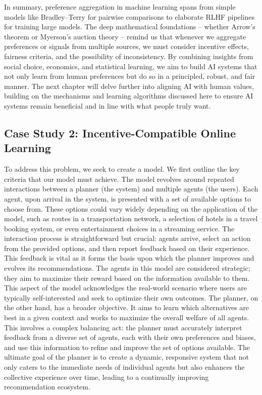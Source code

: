 \documentclass[
  letterpaper,
  numbers=noenddot,
  DIV=11]{scrreprt}
\theoremstyle{plain}
\theoremstyle{definition}
\theoremstyle{remark}
\begin{document}
In summary, preference aggregation in machine learning spans from simple
models like Bradley--Terry for pairwise comparisons to elaborate RLHF
pipelines for training large models. The deep mathematical foundations
-- whether Arrow's theorem or Myerson's auction theory -- remind us that
whenever we aggregate preferences or signals from multiple sources, we
must consider incentive effects, fairness criteria, and the possibility
of inconsistency. By combining insights from social choice, economics,
and statistical learning, we aim to build AI systems that not only learn
from human preferences but do so in a principled, robust, and fair
manner. The next chapter will delve further into aligning AI with human
values, building on the mechanisms and learning algorithms discussed
here to ensure AI systems remain beneficial and in line with what people
truly want.

\subsection{Case Study 2: Incentive-Compatible Online
Learning}\label{case-study-2-incentive-compatible-online-learning}

To address this problem, we seek to create a model. We first outline the
key criteria that our model must achieve. The model revolves around
repeated interactions between a planner (the system) and multiple agents
(the users). Each agent, upon arrival in the system, is presented with a
set of available options to choose from. These options could vary widely
depending on the application of the model, such as routes in a
transportation network, a selection of hotels in a travel booking
system, or even entertainment choices in a streaming service. The
interaction process is straightforward but crucial: agents arrive,
select an action from the provided options, and then report feedback
based on their experience. This feedback is vital as it forms the basis
upon which the planner improves and evolves its recommendations. The
agents in this model are considered strategic; they aim to maximize
their reward based on the information available to them. This aspect of
the model acknowledges the real-world scenario where users are typically
self-interested and seek to optimize their own outcomes. The planner, on
the other hand, has a broader objective. It aims to learn which
alternatives are best in a given context and works to maximize the
overall welfare of all agents. This involves a complex balancing act:
the planner must accurately interpret feedback from a diverse set of
agents, each with their own preferences and biases, and use this
information to refine and improve the set of options available. The
ultimate goal of the planner is to create a dynamic, responsive system
that not only caters to the immediate needs of individual agents but
also enhances the collective experience over time, leading to a
continually improving recommendation ecosystem.
\end{document}
